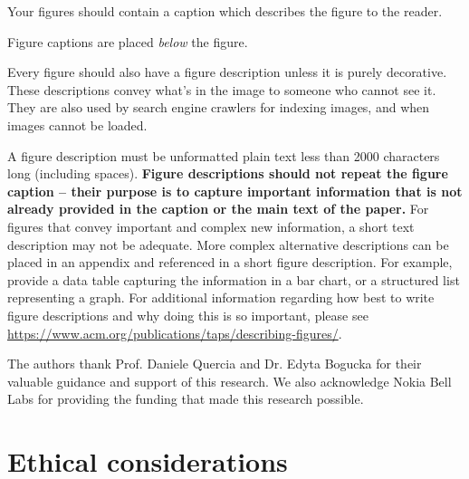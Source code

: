 \documentclass[sigconf, authorversion, nonacm, screen]{acmart}
\begin{document}
Your figures should contain a caption which describes the figure to
the reader.

Figure captions are placed {\itshape below} the figure.

Every figure should also have a figure description unless it is purely
decorative. These descriptions convey what’s in the image to someone
who cannot see it. They are also used by search engine crawlers for
indexing images, and when images cannot be loaded.

A figure description must be unformatted plain text less than 2000
characters long (including spaces).  {\bfseries Figure descriptions
  should not repeat the figure caption – their purpose is to capture
  important information that is not already provided in the caption or
  the main text of the paper.} For figures that convey important and
complex new information, a short text description may not be
adequate. More complex alternative descriptions can be placed in an
appendix and referenced in a short figure description. For example,
provide a data table capturing the information in a bar chart, or a
structured list representing a graph.  For additional information
regarding how best to write figure descriptions and why doing this is
so important, please see
\url{https://www.acm.org/publications/taps/describing-figures/}.

\begin{acks}
The authors thank Prof. Daniele Quercia and Dr. Edyta Bogucka for their valuable guidance and support of this research. We also acknowledge Nokia Bell Labs for providing the funding that made this research possible.
\end{acks}





\appendix

\section{Ethical considerations}
\end{document}
